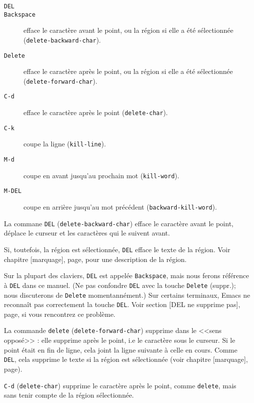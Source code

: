 \begin{description}
\item[\texttt{DEL}]
\item[\texttt{Backspace}] efface le caractère avant le point, ou la
  région si elle a été sélectionnée (\texttt{delete-backward-char}).
\item[\texttt{Delete}] efface le caractère après le point, ou la
  région si elle a été sélectionnée (\texttt{delete-forward-char}).
\item[\texttt{C-d}] efface le caractère après le point
  (\texttt{delete-char}).
\item[\texttt{C-k}] coupe la ligne (\texttt{kill-line}).
\item[\texttt{M-d}] coupe en avant jusqu'au prochain mot
  (\texttt{kill-word}).
\item[\texttt{M-DEL}] coupe en arrière jusqu'au mot précédent
  (\texttt{backward-kill-word}).  
\end{description}
La commane \texttt{DEL} (\texttt{delete-backward-char}) efface le
caractère avant le point, déplace le curseur et les caractères qui le
suivent avant.\par

Si, toutefois, la région est sélectionnée, \texttt{DEL} efface le
texte de la région. Voir chapitre [marquage], page,
pour une description de la région.\par

Sur la plupart des claviers, \texttt{DEL} est appelée
\texttt{Backspace}, mais nous ferons référence à \texttt{DEL} dans ce
manuel. (Ne pas confondre \texttt{DEL} avec la touche \texttt{Delete}
(suppr.); nous discuterons de \texttt{Delete} momentannément.) Sur
certains terminaux, Emacs ne reconnaît pas correctement la touche
\texttt{DEL}. Voir section [DEL ne supprime pas],
page, si vous rencontrez ce problème.\par 

La commande \texttt{delete} (\texttt{delete-forward-char}) supprime
dans le <<sens opposé>> : elle supprime après le point, i.e le
caractère sous le curseur. Si le point était en fin de ligne, cela
joint la ligne suivante à celle en cours. Comme \texttt{DEL}, cela
supprime le texte si la région est sélectionnée (voir chapitre
[marquage], page).\par

\texttt{C-d} (\texttt{delete-char}) supprime le caractère après le
point, comme \texttt{delete}, mais sans tenir compte de la région
sélectionnée.\par 

